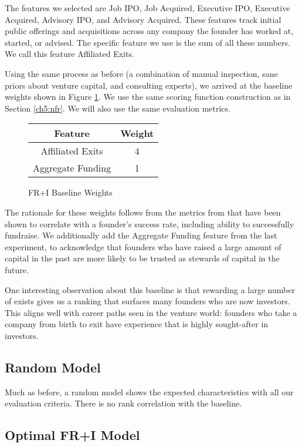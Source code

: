 The features we selected are Job IPO, Job Acquired, Executive IPO, Executive Acquired, Advisory IPO, and Advisory Acquired. These features track initial public offerings and acquisitions across any company the founder has worked at, started, or advised. The specific feature we use is the sum of all these numbers. We call this feature Affiliated Exits.

Using the same process as before (a combination of manual inspection, sane priors about venture capital, and consulting experts), we arrived at the baseline weights shown in Figure \ref{fig:fri:baseline:weights}. We use the same scoring function construction as in Section \ref{ch5:nfr}. We will also use the same evaluation metrics.

\begin{figure}[ht]
\begin{tabular}{c | c}
\textbf{Feature}   & \textbf{Weight} \\\hline
Affiliated Exits   & 4 \\\hline
Aggregate Funding  & 1
\end{tabular}
\centering
\caption{FR+I Baseline Weights}
\label{fig:fri:baseline:weights}
\end{figure}

The rationale for these weights follows from the metrics from \cite{2017arXiv170604229H} that have been shown to correlate with a founder's success rate, including ability to successfully fundraise. We additionally add the Aggregate Funding feature from the last experiment, to acknowledge that founders who have raised a large amount of capital in the past are more likely to be trusted as stewards of capital in the future.

One interesting observation about this baseline is that rewarding a large number of exists gives us a ranking that surfaces many founders who are now investors. This aligns well with career paths seen in the venture world: founders who take a company from birth to exit have experience that is highly sought-after in investors.

\subsection{Random Model}

Much as before, a random model shows the expected characteristics with all our evaluation criteria. There is no rank correlation with the baseline.

\subsection{Optimal FR+I Model}

